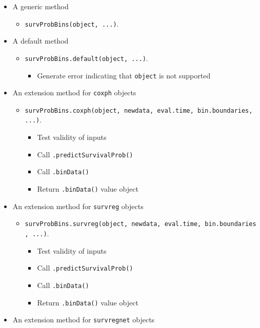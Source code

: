 \documentclass[
]{book}
\providecommand{\tightlist}{%
  \setlength{\itemsep}{0pt}\setlength{\parskip}{0pt}}
\begin{document}
\begin{itemize}
\tightlist
\item
  A generic method

  \begin{itemize}
  \tightlist
  \item
    \texttt{survProbBins(object,\ ...)}.
  \end{itemize}
\item
  A default method

  \begin{itemize}
  \tightlist
  \item
    \texttt{survProbBins.default(object,\ ...)}.

    \begin{itemize}
    \tightlist
    \item
      Generate error indicating that \texttt{object} is not supported
    \end{itemize}
  \end{itemize}
\item
  An extension method for \texttt{coxph} objects

  \begin{itemize}
  \tightlist
  \item
    \texttt{survProbBins.coxph(object,\ newdata,\ eval.time,\ bin.boundaries,\ ...)}.

    \begin{itemize}
    \tightlist
    \item
      Test validity of inputs
    \item
      Call \texttt{.predictSurvivalProb()}
    \item
      Call \texttt{.binData()}
    \item
      Return \texttt{.binData()} value object
    \end{itemize}
  \end{itemize}
\item
  An extension method for \texttt{survreg} objects

  \begin{itemize}
  \tightlist
  \item
    \texttt{survProbBins.survreg(object,\ newdata,\ eval.time,\ bin.boundaries,\ ...)}.

    \begin{itemize}
    \tightlist
    \item
      Test validity of inputs
    \item
      Call \texttt{.predictSurvivalProb()}
    \item
      Call \texttt{.binData()}
    \item
      Return \texttt{.binData()} value object
    \end{itemize}
  \end{itemize}
\item
  An extension method for \texttt{survregnet} objects


\end{itemize}
\end{document}
